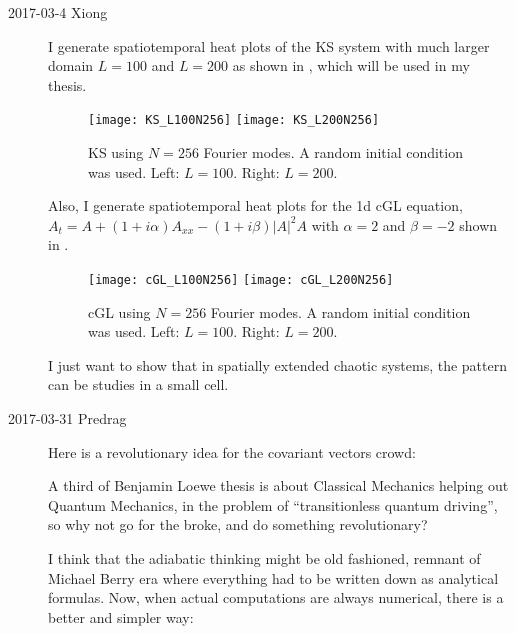 \begin{description}
\item[2017-03-4 Xiong]
  I generate spatiotemporal heat plots of the KS system with
  much larger domain $L=100$ and $L=200$ as shown
  in ,
  which will be used in my thesis.
  \begin{figure}[h]
    \centering
    \texttt{[image: KS\_L100N256]}
    \texttt{[image: KS\_L200N256]}
    \caption{KS using $N=256$ Fourier modes.
      A random initial condition was used.
      Left: $L=100$. Right: $L=200$. }
    \label{fig:KS_LargeL}
  \end{figure}

  Also, I generate spatiotemporal heat plots for the 1d cGL equation,
  $A_t = A + (1 + i\alpha)A_{xx} - (1 +i\beta)|A|^2A$ with
  $\alpha=2$ and $\beta=-2$ shown in .
  \begin{figure}[h]
    \centering
    \texttt{[image: cGL\_L100N256]}
    \texttt{[image: cGL\_L200N256]}
    \caption{cGL using $N=256$ Fourier modes.
      A random initial condition was used.
      Left: $L=100$. Right: $L=200$. }
    \label{fig:cGL_LargeL}
  \end{figure}

  I just want to show that in spatially extended chaotic systems,
  the pattern can be studies in a small cell.

\item[2017-03-31 Predrag] Here is a revolutionary idea for
the covariant vectors crowd:

A third of Benjamin Loewe thesis is about
Classical Mechanics helping out Quantum Mechanics, in the problem of
``transitionless quantum driving'', so why not go for the
broke, and do something revolutionary?

I think that the adiabatic thinking might be old fashioned, remnant of
Michael Berry era where everything had to be written down as analytical
formulas. Now, when actual computations are always numerical, there is a
better and simpler way:


\end{description}
